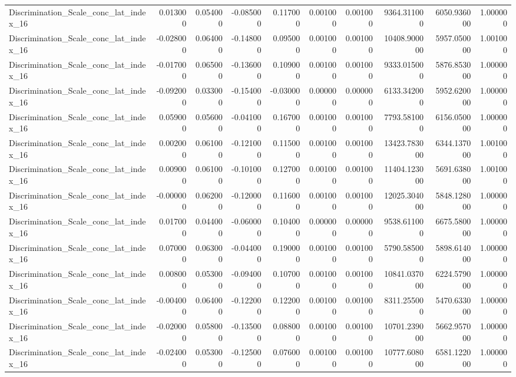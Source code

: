 \begin{table}
\begin{tabular}{lrrrrrrrrr}
Discrimination_Scale_conc_lat_index_16 & 0.013000 & 0.054000 & -0.085000 & 0.117000 & 0.001000 & 0.001000 & 9364.311000 & 6050.936000 & 1.000000 \\
Discrimination_Scale_conc_lat_index_16 & -0.028000 & 0.064000 & -0.148000 & 0.095000 & 0.001000 & 0.001000 & 10408.900000 & 5957.050000 & 1.001000 \\
Discrimination_Scale_conc_lat_index_16 & -0.017000 & 0.065000 & -0.136000 & 0.109000 & 0.001000 & 0.001000 & 9333.015000 & 5876.853000 & 1.000000 \\
Discrimination_Scale_conc_lat_index_16 & -0.092000 & 0.033000 & -0.154000 & -0.030000 & 0.000000 & 0.000000 & 6133.342000 & 5952.620000 & 1.000000 \\
Discrimination_Scale_conc_lat_index_16 & 0.059000 & 0.056000 & -0.041000 & 0.167000 & 0.001000 & 0.001000 & 7793.581000 & 6156.050000 & 1.000000 \\
Discrimination_Scale_conc_lat_index_16 & 0.002000 & 0.061000 & -0.121000 & 0.115000 & 0.001000 & 0.001000 & 13423.783000 & 6344.137000 & 1.001000 \\
Discrimination_Scale_conc_lat_index_16 & 0.009000 & 0.061000 & -0.101000 & 0.127000 & 0.001000 & 0.001000 & 11404.123000 & 5691.638000 & 1.001000 \\
Discrimination_Scale_conc_lat_index_16 & -0.000000 & 0.062000 & -0.120000 & 0.116000 & 0.001000 & 0.001000 & 12025.304000 & 5848.128000 & 1.000000 \\
Discrimination_Scale_conc_lat_index_16 & 0.017000 & 0.044000 & -0.060000 & 0.104000 & 0.000000 & 0.000000 & 9538.611000 & 6675.580000 & 1.000000 \\
Discrimination_Scale_conc_lat_index_16 & 0.070000 & 0.063000 & -0.044000 & 0.190000 & 0.001000 & 0.001000 & 5790.585000 & 5898.614000 & 1.000000 \\
Discrimination_Scale_conc_lat_index_16 & 0.008000 & 0.053000 & -0.094000 & 0.107000 & 0.001000 & 0.001000 & 10841.037000 & 6224.579000 & 1.000000 \\
Discrimination_Scale_conc_lat_index_16 & -0.004000 & 0.064000 & -0.122000 & 0.122000 & 0.001000 & 0.001000 & 8311.255000 & 5470.633000 & 1.000000 \\
Discrimination_Scale_conc_lat_index_16 & -0.020000 & 0.058000 & -0.135000 & 0.088000 & 0.001000 & 0.001000 & 10701.239000 & 5662.957000 & 1.000000 \\
Discrimination_Scale_conc_lat_index_16 & -0.024000 & 0.053000 & -0.125000 & 0.076000 & 0.001000 & 0.001000 & 10777.608000 & 6581.122000 & 1.000000 \\

\end{tabular}
\end{table}
